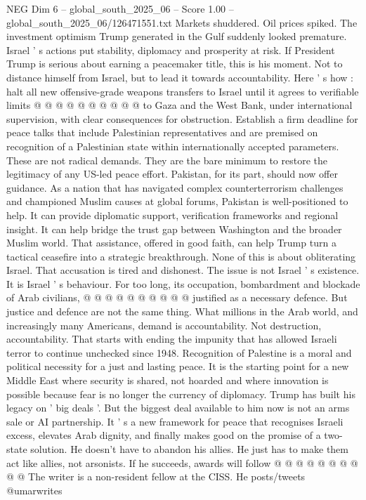 \begin{textsample}{NEG Dim 6 – global\_south\_2025\_06 – Score 1.00 – global\_south\_2025\_06/126471551.txt}
Markets shuddered.
Oil prices spiked.
The investment optimism Trump generated in the Gulf suddenly looked premature.
Israel ' s actions put stability, diplomacy and prosperity at risk.
If President Trump is serious about earning a peacemaker title, this is his moment.
Not to distance himself from Israel, but to lead it towards accountability.
Here ' s how : halt all new offensive-grade weapons transfers to Israel until it agrees to verifiable limits @ @ @ @ @ @ @ @ @ @ to Gaza and the West Bank, under international supervision, with clear consequences for obstruction.
Establish a firm deadline for peace talks that include Palestinian representatives and are premised on recognition of a Palestinian state within internationally accepted parameters.
These are not radical demands.
They are the bare minimum to restore the legitimacy of any US-led peace effort.
Pakistan, for its part, should now offer guidance.
As a nation that has navigated complex counterterrorism challenges and championed Muslim causes at global forums, Pakistan is well-positioned to help.
It can provide diplomatic support, verification frameworks and regional insight.
It can help bridge the trust gap between Washington and the broader Muslim world.
That assistance, offered in good faith, can help Trump turn a tactical ceasefire into a strategic breakthrough.
None of this is about obliterating Israel.
That accusation is tired and dishonest.
The issue is not Israel ' s existence.
It is Israel ' s behaviour.
For too long, its occupation, bombardment and blockade of Arab civilians, @ @ @ @ @ @ @ @ @ @ justified as a necessary defence.
But justice and defence are not the same thing.
What millions in the Arab world, and increasingly many Americans, demand is accountability.
Not destruction, accountability.
That starts with ending the impunity that has allowed Israeli terror to continue unchecked since 1948.
Recognition of Palestine is a moral and political necessity for a just and lasting peace.
It is the starting point for a new Middle East where security is shared, not hoarded and where innovation is possible because fear is no longer the currency of diplomacy.
Trump has built his legacy on ' big deals '.
But the biggest deal available to him now is not an arms sale or AI partnership.
It ' s a new framework for peace that recognises Israeli excess, elevates Arab dignity, and finally makes good on the promise of a two-state solution.
He doesn't have to abandon his allies.
He just has to make them act like allies, not arsonists.
If he succeeds, awards will follow @ @ @ @ @ @ @ @ @ @ The writer is a non-resident fellow at the CISS.
He posts/tweets @umarwrites

\end{textsample}
